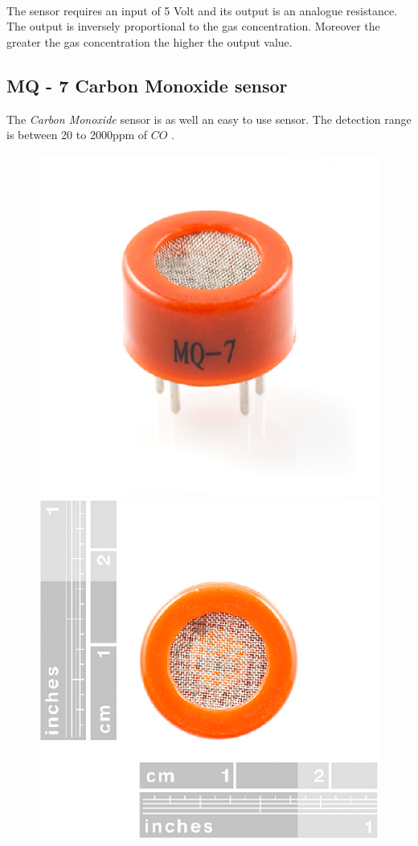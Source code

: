 \documentclass[12pt,a4paper]{report}
\begin{document}
\ \\
The sensor requires an input of 5 Volt and its output is an analogue resistance. The output is inversely proportional to the gas concentration. Moreover the greater the gas concentration the higher the output value.
\ \\
%
\subsection{MQ - 7 Carbon Monoxide  sensor}
The \emph{Carbon Monoxide} sensor is as well an easy to use sensor.  The detection range is between 20 to 2000ppm of $CO$ \cite{website:mq7}.
\ \\
\begin{figure}[H]
\centering
\includegraphics*[scale=0.45]{mq7}
\includegraphics*[scale=0.45]{mq7_2}

\end{figure}
\end{document}
